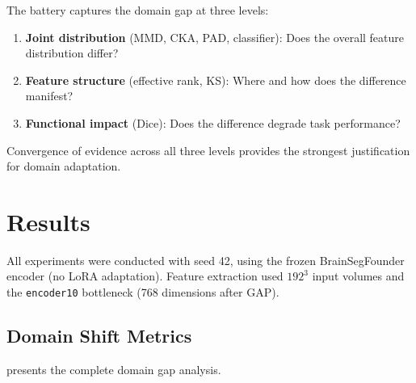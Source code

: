 \documentclass[11pt,a4paper]{article}
\theoremstyle{definition}
\begin{document}
The battery captures the domain gap at three levels:
\begin{enumerate}[nosep]
  \item \textbf{Joint distribution} (MMD, CKA, PAD, classifier): Does the overall feature distribution differ?
  \item \textbf{Feature structure} (effective rank, KS): Where and how does the difference manifest?
  \item \textbf{Functional impact} (Dice): Does the difference degrade task performance?
\end{enumerate}

Convergence of evidence across all three levels provides the strongest justification for domain adaptation.


\section{Results}\label{sec:results}

All experiments were conducted with seed 42, using the frozen BrainSegFounder encoder (no LoRA adaptation). Feature extraction used $192^3$ input volumes and the \texttt{encoder10} bottleneck (768 dimensions after GAP).

\subsection{Domain Shift Metrics}

 presents the complete domain gap analysis.
\end{document}

